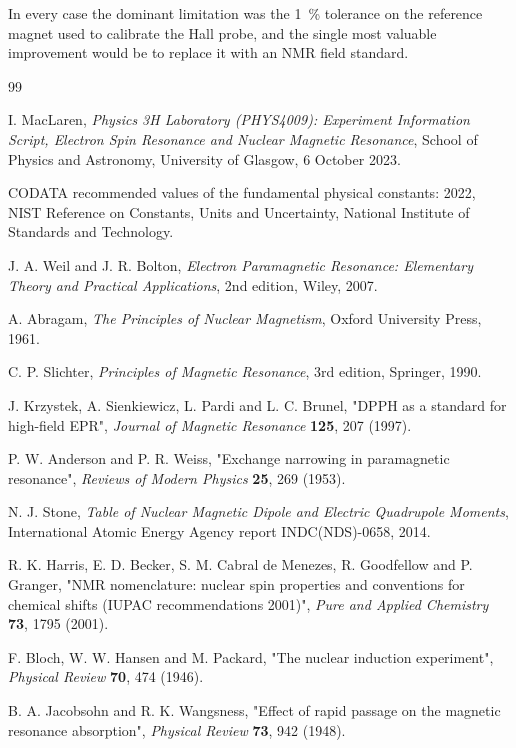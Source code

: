 \documentclass[11pt,a4paper]{article}
\begin{document}
In every case the dominant limitation was the \SI{1}{\percent} tolerance on the reference magnet
used to calibrate the Hall probe, and the single most valuable improvement would be to replace it
with an NMR field standard.

\begin{thebibliography}{99}

 I. MacLaren, \textit{Physics 3H Laboratory (PHYS4009): Experiment Information
Script, Electron Spin Resonance and Nuclear Magnetic Resonance}, School of Physics and Astronomy,
University of Glasgow, 6 October 2023.

 CODATA recommended values of the fundamental physical constants: 2022, NIST
Reference on Constants, Units and Uncertainty, National Institute of Standards and Technology.

 J. A. Weil and J. R. Bolton, \textit{Electron Paramagnetic Resonance:
Elementary Theory and Practical Applications}, 2nd edition, Wiley, 2007.

 A. Abragam, \textit{The Principles of Nuclear Magnetism}, Oxford University
Press, 1961.

 C. P. Slichter, \textit{Principles of Magnetic Resonance}, 3rd edition,
Springer, 1990.

 J. Krzystek, A. Sienkiewicz, L. Pardi and L. C. Brunel, "DPPH as a standard for
high-field EPR", \textit{Journal of Magnetic Resonance} \textbf{125}, 207 (1997).

 P. W. Anderson and P. R. Weiss, "Exchange narrowing in paramagnetic
resonance", \textit{Reviews of Modern Physics} \textbf{25}, 269 (1953).

 N. J. Stone, \textit{Table of Nuclear Magnetic Dipole and Electric Quadrupole
Moments}, International Atomic Energy Agency report INDC(NDS)-0658, 2014.

 R. K. Harris, E. D. Becker, S. M. Cabral de Menezes, R. Goodfellow and P.
Granger, "NMR nomenclature: nuclear spin properties and conventions for chemical shifts (IUPAC
recommendations 2001)", \textit{Pure and Applied Chemistry} \textbf{73}, 1795 (2001).

 F. Bloch, W. W. Hansen and M. Packard, "The nuclear induction experiment",
\textit{Physical Review} \textbf{70}, 474 (1946).

 B. A. Jacobsohn and R. K. Wangsness, "Effect of rapid passage on the magnetic
resonance absorption", \textit{Physical Review} \textbf{73}, 942 (1948).


\end{thebibliography}
\end{document}
